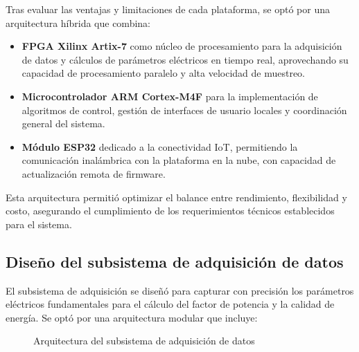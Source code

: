 \documentclass{report}          %
\begin{document}
                Tras evaluar las ventajas y limitaciones de cada plataforma, se optó por una arquitectura híbrida que combina:
        
                \begin{itemize}
                    \item \textbf{FPGA Xilinx Artix-7} como núcleo de procesamiento para la adquisición de datos y cálculos de parámetros eléctricos en tiempo real, aprovechando su capacidad de procesamiento paralelo y alta velocidad de muestreo.
                    
                    \item \textbf{Microcontrolador ARM Cortex-M4F} para la implementación de algoritmos de control, gestión de interfaces de usuario locales y coordinación general del sistema.
                    
                    \item \textbf{Módulo ESP32} dedicado a la conectividad IoT, permitiendo la comunicación inalámbrica con la plataforma en la nube, con capacidad de actualización remota de firmware.
                \end{itemize}
                
                Esta arquitectura permitió optimizar el balance entre rendimiento, flexibilidad y costo, asegurando el cumplimiento de los requerimientos técnicos establecidos para el sistema.
            
            \subsection{Diseño del subsistema de adquisición de datos}
                El subsistema de adquisición se diseñó para capturar con precisión los parámetros eléctricos fundamentales para el cálculo del factor de potencia y la calidad de energía. Se optó por una arquitectura modular que incluye:
                
                \begin{figure}[H]
                    \centering
                    \caption{Arquitectura del subsistema de adquisición de datos}
                \end{figure}
            
\end{document}
